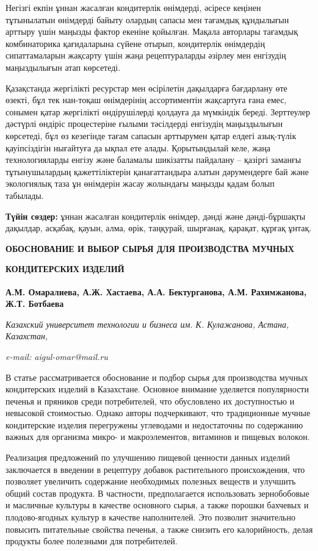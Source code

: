 Негізгі екпін ұннан жасалған кондитерлік өнімдерді, әсіресе кеңінен
тұтынылатын өнімдерді байыту олардың сапасы мен тағамдық құндылығын
арттыру үшін маңызды фактор екеніне қойылған. Мақала авторлары тағамдық
комбинаторика қағидаларына сүйене отырып, кондитерлік өнімдердің
сипаттамаларын жақсарту үшін жаңа рецептураларды әзірлеу мен енгізудің
маңыздылығын атап көрсетеді.

Қазақстанда жергілікті ресурстар мен өсірілетін дақылдарға бағдарлану
өте өзекті, бұл тек нан-тоқаш өнімдерінің ассортиментін жақсартуға ғана
емес, сонымен қатар жергілікті өндірушілерді қолдауға да мүмкіндік
береді. Зерттеулер дәстүрлі өндіріс процестеріне ғылыми тәсілдерді
енгізудің маңыздылығын көрсетеді, бұл өз кезегінде тағам сапасын
арттырумен қатар елдегі азық-түлік қауіпсіздігін нығайтуға да ықпал ете
алады. Қорытындылай келе, жаңа технологияларды енгізу және баламалы
шикізатты пайдалану -- қазіргі заманғы тұтынушылардың қажеттіліктерін
қанағаттандыра алатын дәрумендерге бай және экологиялық таза ұн
өнімдерін жасау жолындағы маңызды қадам болып табылады.

{\bfseries Түйін сөздер:} ұннан жасалған кондитерлік өнімдер, дәнді және
дәнді-бұршақты дақылдар, асқабақ, қауын, алма, өрік, таңқурай, шырғанақ,
қарақат, құрғақ ұнтақ.

\hl{}

{\bfseries ОБОСНОВАНИЕ И ВЫБОР СЫРЬЯ ДЛЯ ПРОИЗВОДСТВА МУЧНЫХ}

{\bfseries КОНДИТЕРСКИХ ИЗДЕЛИЙ}

{\bfseries А.М. Омаралиева\textsuperscript{\envelope }, А.Ж. Хастаева, А.А.
Бектурганова, А.М. Рахимжанова, Ж.Т. Ботбаева}

\emph{Казахский университет технологии и бизнеса им. К. Кулажанова,
Астана, Казахстан,}

\emph{e-mail: aigul-omar@mail.ru}

В статье рассматривается обоснование и подбор сырья для производства
мучных кондитерских изделий в Казахстане. Основное внимание уделяется
популярности печенья и пряников среди потребителей, что обусловлено их
доступностью и невысокой стоимостью. Однако авторы подчеркивают, что
традиционные мучные кондитерские изделия перегружены углеводами и
недостаточны по содержанию важных для организма микро- и макроэлементов,
витаминов и пищевых волокон.

Реализация предложений по улучшению пищевой ценности данных изделий
заключается в введении в рецептуру добавок растительного происхождения,
что позволяет увеличить содержание необходимых полезных веществ и
улучшить общий состав продукта. В частности, предполагается использовать
зернобобовые и масличные культуры в качестве основного сырья, а также
порошки бахчевых и плодово-ягодных культур в качестве наполнителей. Это
позволит значительно повысить питательные свойства печенья, а также
снизить его калорийность, делая продукты более полезными для
потребителей.

